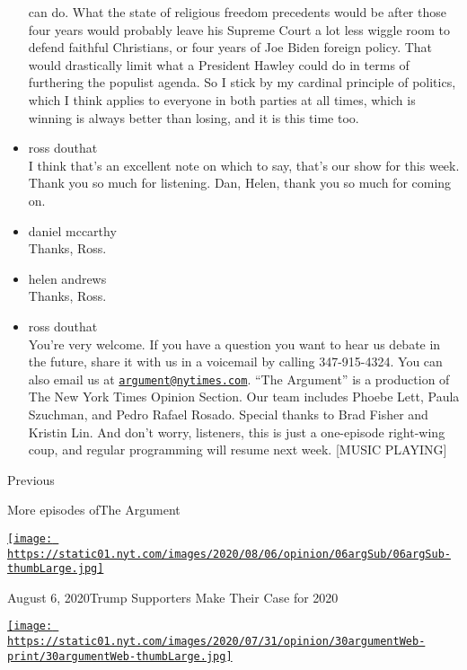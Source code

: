 \begin{itemize}
  can do. What the state of religious freedom precedents would be after
  those four years would probably leave his Supreme Court a lot less
  wiggle room to defend faithful Christians, or four years of Joe Biden
  foreign policy. That would drastically limit what a President Hawley
  could do in terms of furthering the populist agenda. So I stick by my
  cardinal principle of politics, which I think applies to everyone in
  both parties at all times, which is winning is always better than
  losing, and it is this time too.
\item
  ross douthat\\
  I think that's an excellent note on which to say, that's our show for
  this week. Thank you so much for listening. Dan, Helen, thank you so
  much for coming on.
\item
  daniel mccarthy\\
  Thanks, Ross.
\item
  helen andrews\\
  Thanks, Ross.
\item
  ross douthat\\
  You're very welcome. If you have a question you want to hear us debate
  in the future, share it with us in a voicemail by calling
  347-915-4324. You can also email us at
  \href{mailto:argument@nytimes.com}{\nolinkurl{argument@nytimes.com}}.
  ``The Argument'' is a production of The New York Times Opinion
  Section. Our team includes Phoebe Lett, Paula Szuchman, and Pedro
  Rafael Rosado. Special thanks to Brad Fisher and Kristin Lin. And
  don't worry, listeners, this is just a one-episode right-wing coup,
  and regular programming will resume next week. {[}MUSIC PLAYING{]}
\end{itemize}

Previous

More episodes ofThe Argument

\href{https://www.nytimes.com/2020/08/06/opinion/the-argument-trump-coronavirus-election.html?action=click\&module=audio-series-bar\&region=header\&pgtype=Article}{\texttt{[image: https://static01.nyt.com/images/2020/08/06/opinion/06argSub/06argSub-thumbLarge.jpg]}}

August 6, 2020Trump Supporters Make Their Case for 2020

\href{https://www.nytimes.com/2020/07/30/opinion/the-argument-authoritarianism-anne-applebaum.html?action=click\&module=audio-series-bar\&region=header\&pgtype=Article}{\texttt{[image: https://static01.nyt.com/images/2020/07/31/opinion/30argumentWeb-print/30argumentWeb-thumbLarge.jpg]}}

